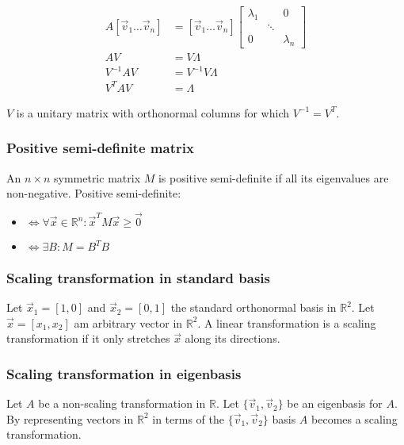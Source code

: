 			\begin{align*}
				A[\vec{v}_1\dots \vec{v}_n] &= [\vec{v}_1\dots \vec{v}_n] \begin{bmatrix}\lambda_1 & & 0\\ & \ddots & \\ 0 & & \lambda_n\end{bmatrix}\\
				AV &= V\Lambda\\
				V^{-1}AV &= V^{-1}V\Lambda\\
				V^TAV &= \Lambda
			\end{align*}

			$V$ is a unitary matrix with orthonormal columns for which $V^{-1}=V^T$.

		\subsubsection{Positive semi-definite matrix}
		An $n\times n$ symmetric matrix $M$ is positive semi-definite if all its eigenvalues are non-negative.
		Positive semi-definite:
		\begin{multicols}{2}
			\begin{itemize}
				\item $\Leftrightarrow\forall \vec{x}\in\mathbb{R}^n: \vec{x}^TM\vec{x}\ge \vec{0}$
				\item $\Leftrightarrow\exists B: M=B^TB$
			\end{itemize}
		\end{multicols}

		\subsubsection{Scaling transformation in standard basis}
		Let $\vec{x}_1 = [1,0]$ and $\vec{x}_2 = [0,1]$ the standard orthonormal basis in $\mathbb{R}^2$.
		Let $\vec{x} = [x_1, x_2]$ am arbitrary vector in $\mathbb{R}^2$.
		A linear transformation is a scaling transformation if it only stretches $\vec{x}$ along its directions.

		\subsubsection{Scaling transformation in eigenbasis}
		Let $A$ be a non-scaling transformation in $\mathbb{R}$.
		Let $\{\vec{v}_1, \vec{v}_2\}$ be an eigenbasis for $A$.
		By representing vectors in $\mathbb{R}^2$ in terms of the $\{\vec{v}_1, \vec{v}_2\}$ basis $A$ becomes a scaling transformation.

